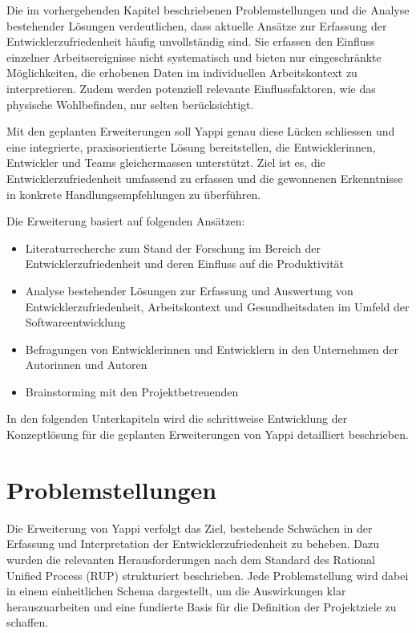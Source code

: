 \documentclass[12pt,a4paper]{report}
\begin{document}
Die im vorhergehenden Kapitel beschriebenen Problemstellungen und die Analyse bestehender Lösungen verdeutlichen, dass aktuelle
Ansätze zur Erfassung der Entwicklerzufriedenheit häufig unvollständig sind. Sie erfassen den Einfluss einzelner Arbeitsereignisse
nicht systematisch und bieten nur eingeschränkte Möglichkeiten, die erhobenen Daten im individuellen Arbeitskontext zu
interpretieren. Zudem werden potenziell relevante Einflussfaktoren, wie das physische Wohlbefinden, nur selten berücksichtigt.

Mit den geplanten Erweiterungen soll Yappi genau diese Lücken schliessen und eine integrierte, praxisorientierte Lösung
bereitstellen, die Entwicklerinnen, Entwickler und Teams gleichermassen unterstützt. Ziel ist es, die Entwicklerzufriedenheit 
umfassend zu erfassen und die gewonnenen Erkenntnisse in konkrete Handlungsempfehlungen zu überführen.

Die Erweiterung basiert auf folgenden Ansätzen:

\begin{itemize}
    \item Literaturrecherche zum Stand der Forschung im Bereich der Entwicklerzufriedenheit und deren Einfluss auf die
      Produktivität
    \item Analyse bestehender Lösungen zur Erfassung und Auswertung von Entwicklerzufriedenheit, Arbeitskontext und 
      Gesundheitsdaten im Umfeld der Softwareentwicklung
    \item Befragungen von Entwicklerinnen und Entwicklern in den Unternehmen der Autorinnen und Autoren
    \item Brainstorming mit den Projektbetreuenden
\end{itemize}

In den folgenden Unterkapiteln wird die schrittweise Entwicklung der Konzeptlösung für die geplanten Erweiterungen von Yappi
detailliert beschrieben.

\section{Problemstellungen}\label{problemstellungen}

Die Erweiterung von Yappi verfolgt das Ziel, bestehende Schwächen in der Erfassung und Interpretation der Entwicklerzufriedenheit
zu beheben. Dazu wurden die relevanten Herausforderungen nach dem Standard des Rational Unified Process (RUP) strukturiert
beschrieben. Jede Problemstellung wird dabei in einem einheitlichen Schema dargestellt, um die Auswirkungen klar herauszuarbeiten
und eine fundierte Basis für die Definition der Projektziele zu schaffen.
\end{document}
